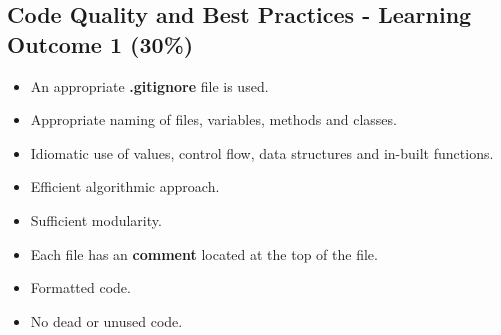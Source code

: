 \documentclass{article}
\begin{document}
\subsection*{Code Quality and Best Practices - Learning Outcome 1 (30\%)}
\begin{itemize}
    \item An appropriate \textbf{.gitignore} file is used. 
    \item Appropriate naming of files, variables, methods and classes.
    \item Idiomatic use of values, control flow, data structures and in-built functions.
    \item Efficient algorithmic approach.
    \item Sufficient modularity.
    \item Each file has an \textbf{comment} located at the top of the file. 
    \item Formatted code.
    \item No dead or unused code.
\end{itemize}  
\end{document}
